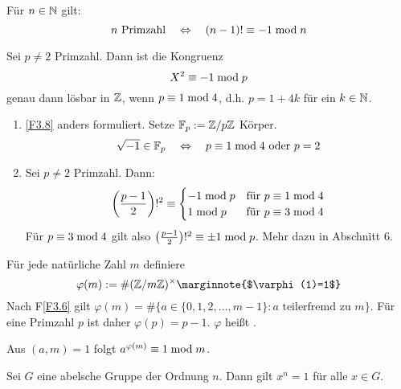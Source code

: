 \begin{falko} \label{F3.7}
	Für $n \in \NN$ gilt: 
	\[ n \text{ Primzahl} \quad \Leftrightarrow \quad (n-1)! \kon -1 \modu n \]
\end{falko}

\begin{falko} \label{F3.8}
	Sei $p \neq 2$ Primzahl. Dann ist die Kongruenz
	\[ X^2 \kon -1 \modu p \]
	genau dann lösbar in $\ZZ$, wenn $p \kon 1 \modu 4$, d.h. $p = 1+4k$ für ein $k \in \NN$.
\end{falko}

	\begin{enumerate}[1)]
		\item \ref{F3.8} anders formuliert. Setze $\FF_p := \ZZ/p\ZZ$ Körper.
		\[ \sqrt{-1} \in \FF_p \quad \Leftrightarrow \quad p \kon 1 \modu 4 \text{ oder } p = 2 \]
		\item Sei $p \neq 2$ Primzahl. Dann:
		\[ \enbrace*{\frac{p-1}{2}}!^2 \kon \begin{cases}
			-1 \modu p & \text{für } p \kon 1 \modu 4 \\
			1 \modu p & \text{für } p \kon 3 \modu 4
		\end{cases} \]
		Für $p \kon 3 \modu 4$ gilt also $\enbrace*{\frac{p-1}{2}}!^2 \kon \pm 1 \modu p$. Mehr dazu in Abschnitt 6.
	\end{enumerate}
	
\begin{defn}
	Für jede natürliche Zahl $m$ definiere
	\[ \varphi(m) := \#(\ZZ/m\ZZ)^\times \marginnote{$\varphi(1)=1$} \]
	Nach F\ref{F3.6} gilt $\varphi(m) = \# \{a \in \{0, 1, 2, \dots, m-1\} : a \text{ teilerfremd zu } m \}$. Für eine Primzahl $p$ ist daher $\varphi(p) = p-1$. $\varphi$ heißt .
\end{defn}

\setcounter{satz}{0}
\begin{satz} \label{satz_3.1a}
	Aus $(a,m) = 1$ folgt $a^{\varphi(m)} \kon 1 \modu m$. 
\end{satz}

\begin{lemma}
	Sei $G$ eine abelsche Gruppe der Ordnung $n$. Dann gilt $x^n = 1$ für alle $x \in G$.
\end{lemma}
\newpage
